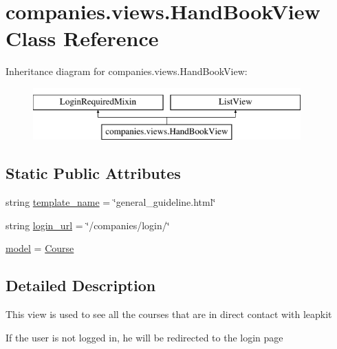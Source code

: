 \hypertarget{classcompanies_1_1views_1_1_hand_book_view}{\section{companies.\-views.\-Hand\-Book\-View Class Reference}
\label{classcompanies_1_1views_1_1_hand_book_view}
}
Inheritance diagram for companies.\-views.\-Hand\-Book\-View\-:\begin{figure}[H]
\begin{center}
\leavevmode
\includegraphics[height=2.000000cm]{classcompanies_1_1views_1_1_hand_book_view}
\end{center}
\end{figure}
\subsection*{Static Public Attributes}
\begin{DoxyCompactItemize}
\item 
string \hyperlink{classcompanies_1_1views_1_1_hand_book_view_a77e51bb1daf5d9fd62a4686a7d482924}{template\-\_\-name} = \char`\"{}general\-\_\-guideline.\-html\char`\"{}
\item 
string \hyperlink{classcompanies_1_1views_1_1_hand_book_view_ad0ef5ddf653ad4e570a8c2fed5541a48}{login\-\_\-url} = \char`\"{}/companies/login/\char`\"{}
\item 
\hyperlink{classcompanies_1_1views_1_1_hand_book_view_af9c3733542a035e2832b9e987ee7e26c}{model} = \hyperlink{classinstitutions_1_1models_1_1_course}{Course}
\end{DoxyCompactItemize}


\subsection{Detailed Description}
\begin{DoxyVerb}This view is used to see all the courses that are in direct contact with leapkit

If the user is not logged in, he will be redirected to the login page
\end{DoxyVerb}
 

